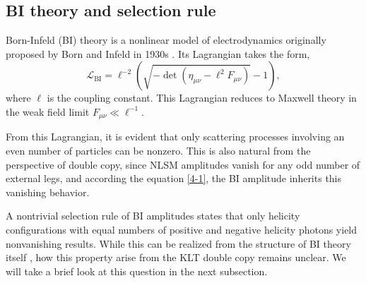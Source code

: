 \documentclass[a4paper,11pt]{article}
\begin{document}
\subsection{BI theory and selection rule}
Born-Infeld (BI) theory is a nonlinear model of electrodynamics originally proposed by Born and Infeld in 1930s \cite{Born:1934gh}. 
Its Lagrangian takes the form,
\begin{equation}
    \mathcal{L}_{\text{BI}}=\ell^{-2}\left(\sqrt{-\det(\eta_{\mu \nu}-\ell^2 F_{\mu \nu})}-1\right),
\end{equation}
where $\ell$ is the coupling constant. This Lagrangian reduces to Maxwell theory in the weak field limit $F_{\mu \nu}\ll \ell^{-1}$.\par
From this Lagrangian, it is evident that only scattering processes involving an even number of particles can be nonzero. 
This is also natural from the perspective of double copy, since NLSM amplitudes vanish for any odd number of external legs, and according the equation \eqref{4-1},
the BI amplitude inherits this vanishing behavior.\par
A nontrivial selection rule of BI amplitudes states that only helicity configurations with equal numbers of positive and negative helicity photons yield nonvanishing results.
While this can be realized from the structure of BI theory itself \cite{Boels:2008fc}, how this property arise from the KLT double copy remains unclear. 
We will take a brief look at this question in the next subsection.
\end{document}
